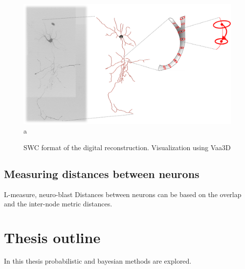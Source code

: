 \begin{figure}
	\begin{center}
		\includegraphics[width=\textwidth]{ch1_fig5} \\
		a 
	\end{center}
	\vspace{-3ex}
	\caption{SWC format of the digital reconstruction. Visualization using Vaa3D \cite{peng2010automatic}}
	\vspace{-1ex}
	\label{ch1__fig5}
\end{figure}


\subsection{Measuring distances between neurons}

L-measure, neuro-blast
Distances between neurons can be based on the overlap and the inter-node metric distances.

\section{Thesis outline}
In this thesis probabilistic and bayesian methods are explored.

